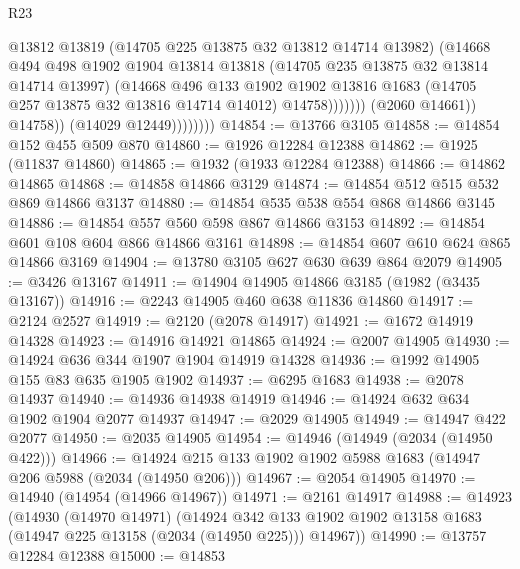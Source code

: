\begin{lexlean}{R23}
\begin{coremodule}
                                  @13812
                                  @13819
                                  (@14705 @225 @13875 @32 @13812 @14714 @13982)
                                  (@14668
                                    @494
                                    @498
                                    @1902
                                    @1904
                                    @13814
                                    @13818
                                    (@14705 @235 @13875 @32 @13814 @14714 @13997)
                                    (@14668
                                      @496
                                      @133
                                      @1902
                                      @1902
                                      @13816
                                      @1683
                                      (@14705 @257 @13875 @32 @13816 @14714 @14012)
                                      @14758)))))))
                        (@2060 @14661))
                      @14758))
                  (@14029 @12449))))))))
@14854 := @13766 @3105
@14858 := @14854 @152 @455 @509 @870
@14860 := @1926 @12284 @12388
@14862 := @1925 (@11837 @14860)
@14865 := @1932 (@1933 @12284 @12388)
@14866 := @14862 @14865
@14868 := @14858 @14866 @3129
@14874 := @14854 @512 @515 @532 @869 @14866 @3137
@14880 := @14854 @535 @538 @554 @868 @14866 @3145
@14886 := @14854 @557 @560 @598 @867 @14866 @3153
@14892 := @14854 @601 @108 @604 @866 @14866 @3161
@14898 := @14854 @607 @610 @624 @865 @14866 @3169
@14904 := @13780 @3105 @627 @630 @639 @864 @2079
@14905 := @3426 @13167
@14911 := @14904 @14905 @14866 @3185 (@1982 (@3435 @13167))
@14916 := @2243 @14905 @460 @638 @11836 @14860
@14917 := @2124 @2527
@14919 := @2120 (@2078 @14917)
@14921 := @1672 @14919 @14328
@14923 := @14916 @14921 @14865
@14924 := @2007 @14905
@14930 := @14924 @636 @344 @1907 @1904 @14919 @14328
@14936 := @1992 @14905 @155 @83 @635 @1905 @1902
@14937 := @6295 @1683
@14938 := @2078 @14937
@14940 := @14936 @14938 @14919
@14946 := @14924 @632 @634 @1902 @1904 @2077 @14937
@14947 := @2029 @14905
@14949 := @14947 @422 @2077
@14950 := @2035 @14905
@14954 := @14946 (@14949 (@2034 (@14950 @422)))
@14966 := @14924 @215 @133 @1902 @1902 @5988 @1683 (@14947 @206 @5988 (@2034 (@14950 @206)))
@14967 := @2054 @14905
@14970 := @14940 (@14954 (@14966 @14967))
@14971 := @2161 @14917
@14988 := @14923
    (@14930
      (@14970 @14971)
      (@14924 @342 @133 @1902 @1902 @13158 @1683 (@14947 @225 @13158 (@2034 (@14950 @225))) @14967))
@14990 := @13757 @12284 @12388
@15000 := @14853

\end{coremodule}
\end{lexlean}
